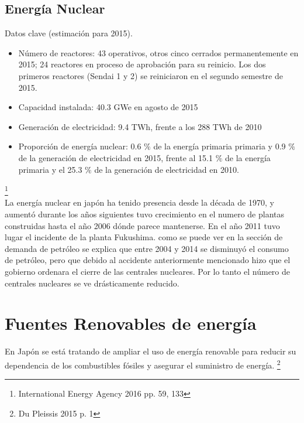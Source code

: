 \documentclass[]{article}
\begin{document}
\subsection{Energía Nuclear}

Datos clave (estimación para 2015).\\

\begin{itemize}

\item Número de reactores: 43 operativos, otros cinco cerrados permanentemente en 2015; 24 reactores en proceso de aprobación para su reinicio. Los dos primeros reactores (Sendai 1 y 2) se reiniciaron en el segundo semestre de 2015.
\item Capacidad instalada: 40.3 GWe en agosto de 2015 
\item Generación de electricidad: 9.4 TWh, frente a los 288 TWh de 2010
\item Proporción de energía nuclear: 0.6 $\%$ de la energía primaria primaria y 0.9 $\%$ de la generación de electricidad en 2015, frente al 15.1 $\%$ de la energía primaria y el 25.3 $\%$ de la generación de electricidad en 2010.

\end{itemize}

\citep{InternationalEnergyAgency2016}\footnote{International Energy Agency 2016 pp. 59, 133}\\

La energía nuclear en japón ha tenido presencia desde la década de 1970, y aumentó durante los años siguientes tuvo crecimiento en el numero de plantas construidas hasta el año 2006 dónde parece mantenerse. En el año 2011 tuvo lugar el incidente de la planta Fukushima. como se puede ver en la sección de demanda de petróleo se explica que entre 2004 y 2014 se disminuyó el consumo de petróleo, pero que debido al accidente anteriormente mencionado hizo que el gobierno ordenara el cierre de las centrales nucleares. Por lo tanto el número de centrales nucleares se ve drásticamente reducido.\\

\section{Fuentes Renovables de energía}

En Japón se está tratando de ampliar el uso de energía renovable para reducir su dependencia de los combustibles fósiles y asegurar el suministro de energía.
\citep{DuPlessis2015}\footnote{Du Pleissis 2015 p. 1}\\
\end{document}
